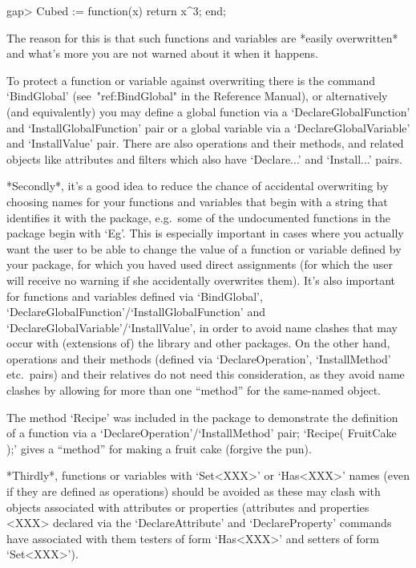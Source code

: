 \beginexample
gap> Cubed := function(x) return x^3; end;
\endexample

The reason for this is that such  functions  and  variables  are  *easily
overwritten* and what's more you are not warned about it when it happens.

To protect a function  or  variable  against  overwriting  there  is  the
command  `BindGlobal'  (see~"ref:BindGlobal"  in  the  {\GAP}   Reference
Manual), or alternatively (and equivalently)  you  may  define  a  global
function via a `DeclareGlobalFunction' and  `InstallGlobalFunction'  pair
or a global variable via  a  `DeclareGlobalVariable'  and  `InstallValue'
pair. There are also operations and their methods,  and  related  objects
like attributes and filters which also have `Declare...' and `Install...'
pairs.

*Secondly*,  it's  a  good  idea  to  reduce  the  chance  of  accidental
overwriting by choosing names for your functions and variables that begin
with a string that identifies it  with  the  package,  e.g.~some  of  the
undocumented functions in the {\Example} package begin with `Eg'. This is
especially important in cases where you actually want the user to be able
to change the value of a function or variable defined  by  your  package,
for which you haved used direct assignments  (for  which  the  user  will
receive no warning  if  she  accidentally  overwrites  them).  It's  also
important  for  functions  and  variables   defined   via   `BindGlobal',
`DeclareGlobalFunction'/`InstallGlobalFunction'                       and
`DeclareGlobalVariable'/`InstallValue', in order to  avoid  name  clashes
that may  occur  with  (extensions  of)  the  {\GAP}  library  and  other
packages. On the other hand, operations and their  methods  (defined  via
`DeclareOperation', `InstallMethod' etc.~pairs) and  their  relatives  do
not need this consideration, as they avoid name clashes by  allowing  for
more than one ``method'' for the same-named object.

The method `Recipe' was included in the {\Example} package to demonstrate
the definition of a  function  via  a  `DeclareOperation'/`InstallMethod'
pair; `Recipe( FruitCake );' gives a ``method'' for making a  fruit  cake
(forgive the pun).

*Thirdly*, functions or variables with  `Set<XXX>'  or  `Has<XXX>'  names
(even if they are defined as operations) should be avoided as  these  may
clash with objects associated with attributes or  properties  (attributes
and  properties   <XXX>   declared   via   the   `DeclareAttribute'   and
`DeclareProperty' commands have associated  with  them  testers  of  form
`Has<XXX>' and setters of form `Set<XXX>').

